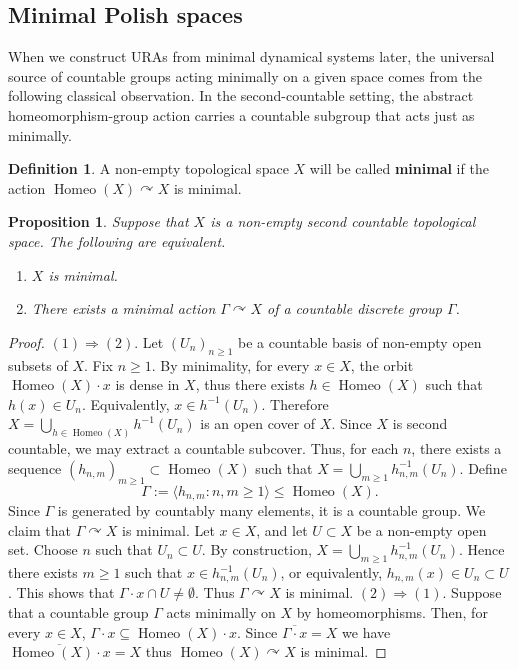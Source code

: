 \documentclass[12pt]{amsart} %
\theoremstyle{plain}
\newtheorem{proposition}[theorem]{Proposition}
\theoremstyle{definition}
\newtheorem{definition}[theorem]{Definition}
\DeclareMathOperator{\Homeo}{Homeo}
\begin{document}
\subsection{Minimal Polish spaces}
When we construct URAs from minimal dynamical systems later, the universal source of countable groups acting minimally on a given space comes from the following classical observation. In the second-countable setting, the abstract homeomorphism-group action carries a countable subgroup that acts just as minimally.
\begin{definition}\label{DefMinSpace}
    A non-empty topological space $X$ will be called \textbf{minimal} if the action $\Homeo(X)\curvearrowright X$ is minimal.
\end{definition}
\begin{proposition}\label{PropMinPolish}
    Suppose that $X$ is a non-empty second countable topological space. The following are equivalent.
    \begin{enumerate}
        \item $X$ is minimal.
        \item There exists a minimal action $\Gamma\curvearrowright X$ of a countable discrete group $\Gamma$.
    \end{enumerate}
\end{proposition}
\begin{proof}\((1)\Rightarrow (2)\). Let $(U_n)_{n\geq 1}$ be a countable basis of non-empty open subsets of $X$. Fix \(n\geq 1\). By minimality, for every
\(x\in X\), the orbit \(\Homeo(X)\cdot x\) is dense in \(X\), thus there exists \(h\in \Homeo(X)\) such that $h(x)\in U_n$. Equivalently, $x\in h^{-1}(U_n)$. Therefore $X=\bigcup_{h\in\Homeo(X)} h^{-1}(U_n)$ is an open cover of \(X\). Since $X$ is second countable, we may extract a countable subcover. Thus, for each \(n\), there exists a sequence $(h_{n,m})_{m\geq 1}\subset \Homeo(X)$ such that $X=\bigcup_{m\geq 1} h_{n,m}^{-1}(U_n)$. Define
\[
        \Gamma:=\langle h_{n,m}:n,m\geq 1\rangle
        \leq \Homeo(X).
\]
Since \(\Gamma\) is generated by countably many elements, it is a countable group. We claim that $\Gamma\curvearrowright X$ is minimal. Let \(x\in X\), and let
\(U\subset X\) be a non-empty open set. Choose \(n\) such that \(U_n\subset U\). By construction, $X=\bigcup_{m\geq 1} h_{n,m}^{-1}(U_n)$. Hence there exists \(m\geq 1\) such that $x\in h_{n,m}^{-1}(U_n)$,
or equivalently, $h_{n,m}(x)\in U_n\subset U$. This shows that $\Gamma\cdot x\cap U\neq\emptyset$. Thus \(\Gamma\curvearrowright X\) is minimal.
\medskip
\noindent\((2)\Rightarrow (1)\). Suppose that a countable group
\(\Gamma\) acts minimally on \(X\) by homeomorphisms. Then, for every \(x\in X\), $\Gamma\cdot x\subseteq \Homeo(X)\cdot x$.
Since $\overline{\Gamma\cdot x}=X$ we have $\overline{\Homeo(X)\cdot x}=X$ thus \(\Homeo(X)\curvearrowright X\) is minimal.\end{proof}
\end{document}
